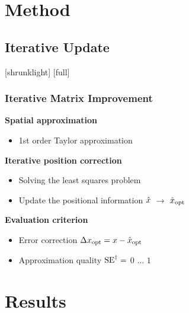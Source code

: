 \documentclass[14pt,compress,aspectratio=169]{beamer} %
\begin{document}
\section{Method}
\subsection{Iterative Update}
[shrunklight]
[full]
\begin{frame}[t]
\frametitle{Iterative Matrix Improvement} 
	\textbf{Spatial approximation}
		\begin{itemize}
		\item 1st order Taylor approximation
		\end{itemize}
	\textbf{Iterative position correction}
		\begin{itemize}
		\item Solving the least squares problem
		\item Update the positional information $\hat{x}$ $\rightarrow$ $\hat{x}_{\operatorname{opt}}$
		\end{itemize}
	\textbf{Evaluation criterion}
		\begin{itemize}
		\item Error correction $\Delta x_{\operatorname{opt}} = x - \hat{x}_{\operatorname{opt}}$
		\item Approximation quality $\operatorname{SE}^{\dagger} =$ $0$ ... $1$
		\end{itemize}
\end{frame}


\section{Results}
\end{document}
